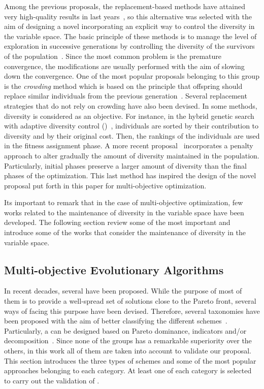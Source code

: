 Among the previous proposals, the replacement-based methods have attained very high-quality results in last years~\cite{Segura:17}, so
this alternative was selected with the aim of designing a novel \MOEA{} incorporating an explicit way to control the diversity 
in the variable space.
%
The basic principle of these methods is to manage the level of exploration in successive generations by 
controlling the diversity of the survivors of the population~\cite{Segura:17}.
%
Since the most common problem is the premature convergence, the modifications are usually performed with the aim
of slowing down the convergence.
%
One of the most popular proposals belonging to this group is the \textit{crowding} method which
is based on the principle that offspring should replace similar individuals from the previous generation~\cite{Mengshoel:14}.
%
Several replacement strategies that do not rely on crowding have also been devised.
%
In some methods, diversity is considered as an objective.
%
For instance, in the hybrid genetic search with adaptive diversity control (\HGSADC{})~\cite{Vidal:13}, individuals are sorted 
by their contribution to diversity and by their original cost.
%
Then, the rankings of the individuals are used in the fitness assignment phase.
%
A more recent proposal~\cite{Segura:17} incorporates a penalty approach to alter gradually the amount of diversity 
maintained in the population.
%
Particularly, initial phases preserve a larger amount of diversity than the final phases of the optimization.
%
This last method has inspired the design of the novel proposal put forth in this paper for multi-objective optimization.
%

Its important to remark that in the case of multi-objective optimization, few works related to the maintenance of 
diversity in the variable space have been developed.
%
The following section review some of the most important \MOEAS{} and introduce some of the works that consider
the maintenance of diversity in the variable space.

\subsection{Multi-objective Evolutionary Algorithms}

In recent decades, several \MOEAS{} have been proposed. 
%
While the purpose of most of them is to provide a well-spread set of solutions close to the Pareto front,
several ways of facing this purpose have been devised.
%
Therefore, several taxonomies have been proposed with the aim of better classifying the different 
schemes~\cite{Joel:BOOK_MOEAs}.
%
Particularly, a \MOEA{} can be designed based on Pareto dominance, indicators and/or decomposition~\cite{Joel:StateArt}.
%
Since none of the groups has a remarkable superiority over the others, in this work all of them are taken into account to validate
our proposal.
%
This section introduces the three types of schemes and some of the most popular approaches belonging to each category.
%
At least one \MOEA{} of each category is selected to carry out the validation of \VSDMOEA{}.

